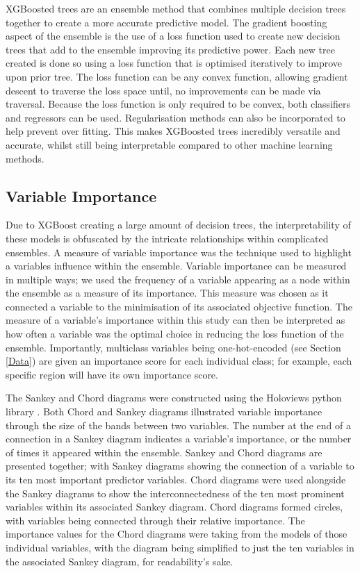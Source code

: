 \documentclass[review,12pt,authoryear]{elsarticle}
\begin{document}
\begin{linenumbers}
\par
XGBoosted trees are an ensemble method that combines multiple decision trees together to create a more accurate predictive model. The gradient boosting aspect of the ensemble is the use of a loss function used to create new decision trees that add to the ensemble improving its predictive power. Each new tree created is done so using a loss function that is optimised iteratively to improve upon prior tree. The loss function can be any convex function, allowing gradient descent to traverse the loss space until, no improvements can be made via traversal. Because the loss function is only required to be convex, both classifiers and regressors can be used. Regularisation methods can also be incorporated to help prevent over fitting. This makes XGBoosted trees incredibly versatile and accurate, whilst still being interpretable compared to other machine learning methods.
\subsection{Variable Importance}\label{sec:importance}
Due to XGBoost creating a large amount of decision trees, the interpretability of these models is obfuscated by the intricate relationships within complicated ensembles. A measure of variable importance was the technique used to highlight a variables influence within the ensemble. Variable importance can be measured in multiple ways; we used the frequency of a variable appearing as a node within the ensemble as a measure of its importance. This measure was chosen as it connected a variable to the minimisation of its associated objective function. The measure of a variable's importance within this study can then be interpreted as how often a variable was the optimal choice in reducing the loss function of the ensemble. Importantly, multiclass variables being one-hot-encoded (see Section \ref{Data}) are given an importance score for each individual class; for example, each specific region will have its own importance score.
\par
The Sankey and Chord diagrams were constructed using the Holoviews python library \citep{philipp_rudiger_2020_3904606}. Both Chord and Sankey diagrams illustrated variable importance through the size of the bands between two variables. The number at the end of a connection in a Sankey diagram indicates a variable's importance, or the number of times it appeared within the ensemble. Sankey and Chord  diagrams are presented together; with Sankey diagrams showing the connection of a variable to its ten most important predictor variables. Chord diagrams were used alongside the Sankey diagrams to show the interconnectedness of the ten most prominent variables within its associated Sankey diagram. Chord diagrams formed circles, with variables being connected through their relative importance. The importance values for the Chord diagrams were taking from the models of those individual variables, with the diagram being simplified to just the ten variables in the associated Sankey diagram, for readability's sake.


\end{linenumbers}
\end{document}
